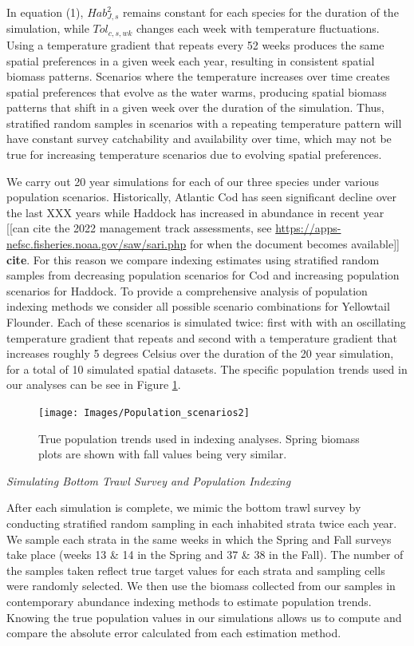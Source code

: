 \documentclass[
  12pt,
]{article}
\begin{document}
In equation (1), \(Hab^2_{J,s}\) remains constant for each species for the duration of the simulation, while \(Tol_{c,s,wk}\) changes each week with temperature fluctuations. Using a temperature gradient that repeats every 52 weeks produces the same spatial preferences in a given week each year, resulting in consistent spatial biomass patterns. Scenarios where the temperature increases over time creates spatial preferences that evolve as the water warms, producing spatial biomass patterns that shift in a given week over the duration of the simulation. Thus, stratified random samples in scenarios with a repeating temperature pattern will have constant survey catchability and availability over time, which may not be true for increasing temperature scenarios due to evolving spatial preferences.

We carry out 20 year simulations for each of our three species under various population scenarios. Historically, Atlantic Cod has seen significant decline over the last XXX years while Haddock has increased in abundance in recent year {[}{[}can cite the 2022 management track assessments, see \url{https://apps-nefsc.fisheries.noaa.gov/saw/sari.php} for when the document becomes available{]}{]} \textbf{cite}. For this reason we compare indexing estimates using stratified random samples from decreasing population scenarios for Cod and increasing population scenarios for Haddock. To provide a comprehensive analysis of population indexing methods we consider all possible scenario combinations for Yellowtail Flounder. Each of these scenarios is simulated twice: first with with an oscillating temperature gradient that repeats and second with a temperature gradient that increases roughly 5 degrees Celsius over the duration of the 20 year simulation, for a total of 10 simulated spatial datasets. The specific population trends used in our analyses can be see in Figure \ref{fig:pop-scenarios}.

\begin{figure}

{\centering \texttt{[image: Images/Population\_scenarios2]} 

}

\caption{True population trends used in indexing analyses. Spring biomass plots are shown with fall values being very similar.}\label{fig:pop-scenarios}
\end{figure}

\emph{Simulating Bottom Trawl Survey and Population Indexing}

After each simulation is complete, we mimic the bottom trawl survey by conducting stratified random sampling in each inhabited strata twice each year. We sample each strata in the same weeks in which the Spring and Fall surveys take place (weeks 13 \& 14 in the Spring and 37 \& 38 in the Fall). The number of the samples taken reflect true target values for each strata and sampling cells were randomly selected. We then use the biomass collected from our samples in contemporary abundance indexing methods to estimate population trends. Knowing the true population values in our simulations allows us to compute and compare the absolute error calculated from each estimation method.
\end{document}
